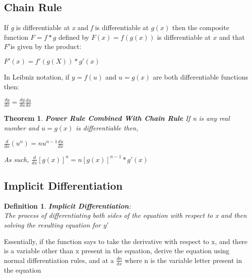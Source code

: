 \documentclass[10pt,a4paper]{article}
\newtheorem{theorem}{Theorem}
\newtheorem{definition}{Definition}
\begin{document}
	\subsection{Chain Rule}
		If \textit{g} is differentiable at \textit{x} and \textit{f} is differentiable at $g(x)$ then the composite function $F = f*g$ defined by $F(x) = f(g(x))$ is differentiable at $x$ and that $F'$is given by the product:
		\begin{center}
			$F'(x) = f'(g(X)) * g'(x)$	
		\end{center}
		In Leibniz notation, if $y=f(u)$ and $u=g(x)$ are both differentiable functions then:
		\begin{center}
			$\frac{dy}{dx} = \frac{dy}{du}\frac{du}{dx}$
		\end{center}
		\begin{theorem}
			\textbf{Power Rule Combined With Chain Rule} If \textit{n} is any real number and $u=g(x)$ is differentiable then,
			\begin{center}
				$\frac{d}{dx}(u^{n}) = nu^{n-1}\frac{du}{dx}$
			\end{center}
			As such, $\frac{d}{dx}[g(x)]^{n} = n[g(x)]^{n-1} * g'(x)$
		\end{theorem}
	\subsection{Implicit Differentiation}
	\begin{definition}
		\textbf{Implicit Differentiation}:
		\\ The process of differentiating both sides of the equation with respect to x and then solving the resulting equation for $y'$
	\end{definition}
	Essentially, if the function says to take the derivative with respect to x, and there is a variable other than x present in the equation, derive the equation using normal differentiation rules, and at a $\frac{dn}{dx}$ where n is the variable letter present in the equation
\end{document}
